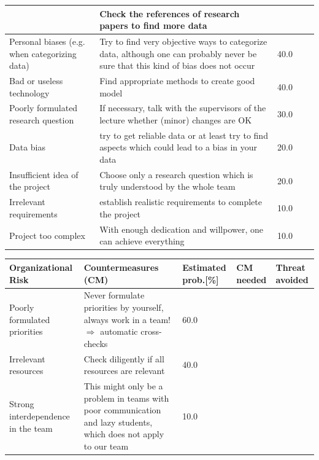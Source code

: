 \begin{center}
\begin{footnotesize}
\begin{tabular}[htb]{|p{2cm}|p{5cm}|p{1.5cm}|p{1cm}|p{1cm}|}
			\rowcolor{lightergray} & Check the references of research papers to find more data & &\cmark &\cmark\\
			\hline
			\rowcolor{lightergray} Personal biases (e.g. when categorizing data) & Try to find very objective ways to categorize data, although one can probably never be sure that this kind of bias does not occur & 40.0&\xmark & \cmark\\
			\hline	
			\rowcolor{lightergray} Bad or useless technology &  Find appropriate methods to create good model & 40.0 &\xmark & \cmark\\ 
			\hline
			\rowcolor{lightergray} Poorly formulated research question & If necessary, talk with the supervisors of the lecture whether (minor) changes are OK & 30.0 & \xmark & \cmark\\
			\hline
			\rowcolor{slightlylightergray} Data bias & try to get reliable data or at least try to find aspects which could lead to a bias in your data & 20.0& \cmark &\cmark\\
			\hline	
			\rowcolor{slightlylightergray} Insufficient idea of the project & Choose only a research question which is truly understood by the whole team & 20.0&\xmark &\cmark\\
			\hline
			\rowcolor{slightlylightergray} Irrelevant requirements & establish realistic requirements to complete the project & 10.0&\xmark &\cmark\\
			\hline	
			\rowcolor{slightlylightergray} Project too complex & With enough dedication and willpower, one can achieve everything & 10.0 &\xmark &\cmark\\
			\hline
		\end{tabular}
	\end{footnotesize}
\end{center}

\begin{center}
	\begin{footnotesize}
		\setlength{\arrayrulewidth}{1,05pt}
		\begin{tabular}[htb]{|p{2cm}|p{5cm}|p{1.5cm}|p{1cm}|p{1cm}|}
			\hline
			\textbf{Organizational Risk}& \textbf{Countermeasures (CM)} &
			\textbf{Estimated prob.[\%]} &\textbf{CM needed} & \textbf{Threat avoided} \\
			\hline
			\hline
			\rowcolor{lightgray} Poorly formulated priorities & Never formulate priorities by yourself, always work in a team! $\Rightarrow$ automatic cross-checks & 60.0&\xmark &\cmark\\
			\hline	
			\rowcolor{lightergray} Irrelevant resources & Check diligently if all resources are relevant & 40.0 &\xmark &\cmark\\
			\hline
			\rowcolor{slightlylightergray} Strong interdependence in the team & This might only be a problem in teams with poor communication and lazy students, which does not apply to our team & 10.0 &\cmark &\xmark\\
			\hline
		\end{tabular}
	\end{footnotesize}
\end{center}

